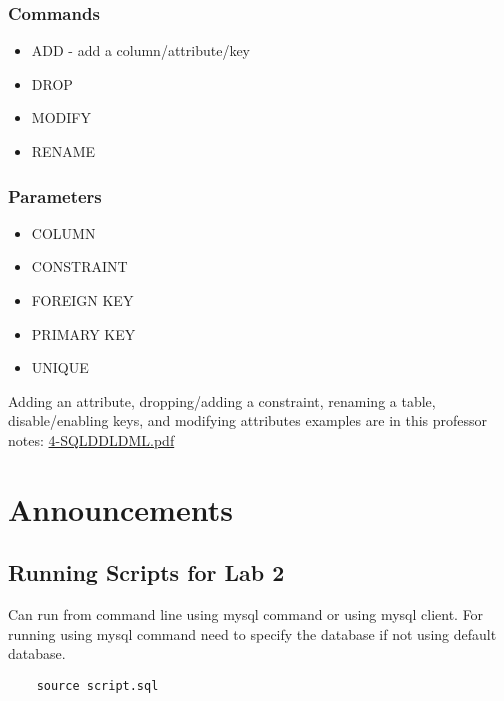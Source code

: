 \documentclass[twoside]{article}
\begin{document}
\subsubsection*{Commands}
\begin{itemize}
    \item ADD - add a column/attribute/key
    \item DROP
    \item MODIFY
    \item RENAME
\end{itemize}
\subsubsection*{Parameters}
\begin{itemize}
    \item COLUMN
    \item CONSTRAINT
    \item FOREIGN KEY
    \item PRIMARY KEY
    \item UNIQUE
\end{itemize}

Adding an attribute, dropping/adding a constraint, renaming a table, disable/enabling
keys, and modifying attributes examples are in this professor notes: \url{4-SQLDDLDML.pdf}

\newpage
\hfill \break 
{}

\section*{Announcements}
\subsection*{Running Scripts for Lab 2}
Can run from command line using mysql command or using mysql client. For running using
mysql command need to specify the database if not using default database.
\begin{verbatim}
    source script.sql
\end{verbatim}
\end{document}
